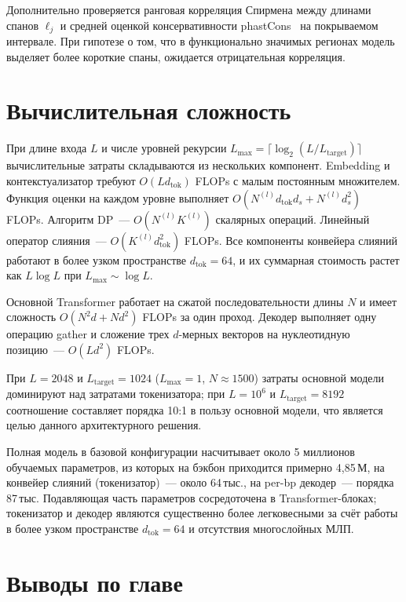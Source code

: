 Дополнительно проверяется ранговая корреляция Спирмена между длинами
спанов $\ell_j$ и средней оценкой консервативности
phastCons~\cite{siepelEvolutionarilyConservedElements2005} на
покрываемом интервале. При гипотезе о том, что в функционально
значимых регионах модель выделяет более короткие спаны, ожидается
отрицательная корреляция.

\section{Вычислительная сложность}

При длине входа $L$ и числе уровней рекурсии $L_{\max} = \lceil
\log_2(L / L_{\text{target}}) \rceil$ вычислительные затраты
складываются из нескольких компонент. Embedding и контекстуализатор
требуют $O(L d_{\text{tok}})$ FLOPs с малым постоянным множителем.
Функция оценки на каждом уровне выполняет $O(N^{(l)} d_{\text{tok}}
d_s + N^{(l)} d_s^2)$ FLOPs. Алгоритм DP~--- $O(N^{(l)} K^{(l)})$
скалярных операций. Линейный оператор слияния~--- $O(K^{(l)}
d_{\text{tok}}^2)$ FLOPs. Все компоненты конвейера слияний работают в
более узком пространстве $d_{\text{tok}} = 64$, и их суммарная
стоимость растет как $L \log L$ при $L_{\max} \sim \log L$.

Основной Transformer работает на сжатой последовательности длины $N$ и
имеет сложность $O(N^2 d + N d^2)$ FLOPs за один проход. Декодер
выполняет одну операцию gather и сложение трех $d$-мерных векторов на
нуклеотидную позицию~--- $O(L d^2)$ FLOPs.

При $L = 2048$ и $L_{\text{target}} = 1024$ ($L_{\max} = 1$, $N \approx
1500$) затраты основной модели доминируют над затратами токенизатора;
при $L = 10^6$ и $L_{\text{target}} = 8192$ соотношение составляет
порядка 10:1 в пользу основной модели, что является целью данного
архитектурного решения.

Полная модель в базовой конфигурации насчитывает около 5 миллионов
обучаемых параметров, из которых на бэкбон приходится примерно
4{,}85\,М, на конвейер слияний (токенизатор)~--- около 64\,тыс.,
на per-bp декодер~--- порядка 87\,тыс. Подавляющая часть параметров
сосредоточена в Transformer-блоках; токенизатор и декодер являются
существенно более легковесными за счёт работы в более узком
пространстве $d_{\text{tok}} = 64$ и отсутствия многослойных МЛП.

\section{Выводы по главе}

